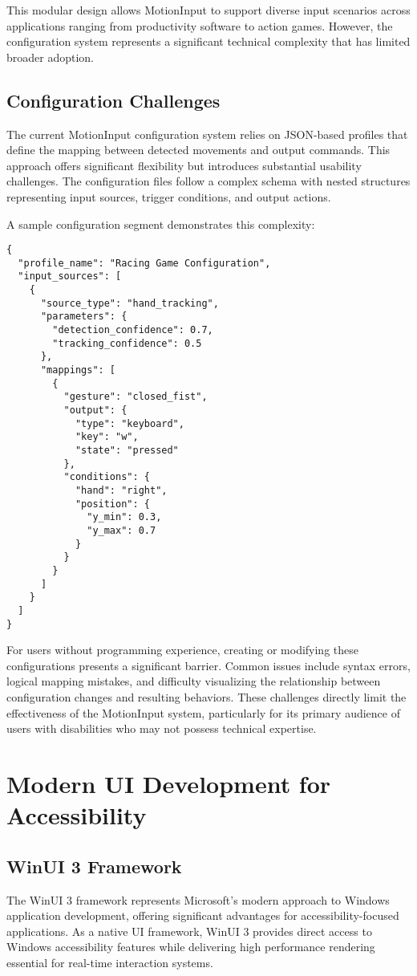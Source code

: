 This modular design allows MotionInput to support diverse input scenarios across applications ranging from productivity software to action games. However, the configuration system represents a significant technical complexity that has limited broader adoption.

\subsection{Configuration Challenges}
The current MotionInput configuration system relies on JSON-based profiles that define the mapping between detected movements and output commands. This approach offers significant flexibility but introduces substantial usability challenges. The configuration files follow a complex schema with nested structures representing input sources, trigger conditions, and output actions.

A sample configuration segment demonstrates this complexity:

\begin{verbatim}
{
  "profile_name": "Racing Game Configuration",
  "input_sources": [
    {
      "source_type": "hand_tracking",
      "parameters": {
        "detection_confidence": 0.7,
        "tracking_confidence": 0.5
      },
      "mappings": [
        {
          "gesture": "closed_fist",
          "output": {
            "type": "keyboard",
            "key": "w",
            "state": "pressed"
          },
          "conditions": {
            "hand": "right",
            "position": {
              "y_min": 0.3,
              "y_max": 0.7
            }
          }
        }
      ]
    }
  ]
}
\end{verbatim}

For users without programming experience, creating or modifying these configurations presents a significant barrier. Common issues include syntax errors, logical mapping mistakes, and difficulty visualizing the relationship between configuration changes and resulting behaviors. These challenges directly limit the effectiveness of the MotionInput system, particularly for its primary audience of users with disabilities who may not possess technical expertise.

\section{Modern UI Development for Accessibility}
\subsection{WinUI 3 Framework}
The WinUI 3 framework represents Microsoft's modern approach to Windows application development, offering significant advantages for accessibility-focused applications. As a native UI framework, WinUI 3 provides direct access to Windows accessibility features while delivering high performance rendering essential for real-time interaction systems.

